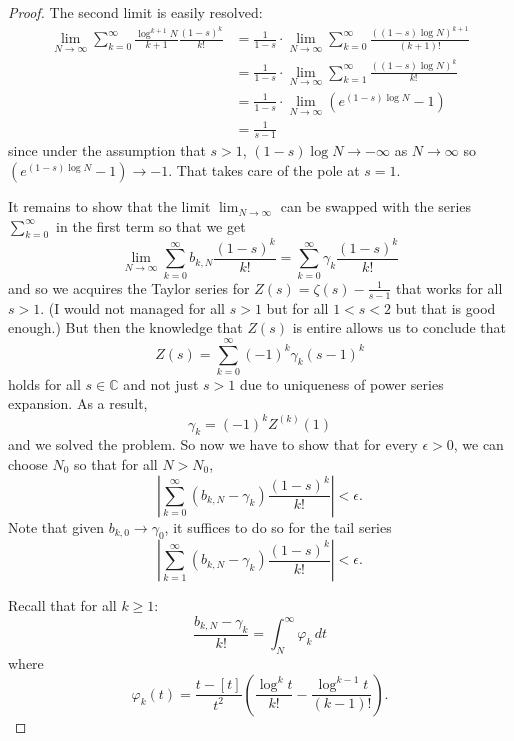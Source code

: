 \documentclass{article}
\newcommand{\C}{\mathbb{C}}
\newcommand{\Abs}[1]{\left| #1 \right|}
\begin{document}
\begin{proof}
The second limit is easily resolved:
\begin{align*}
\lim_{N \rightarrow \infty} \sum_{k = 0}^{\infty} \frac{\log^{k+1} N}{k+1} \frac{(1 - s)^k}{k!} &= \frac{1}{1 - s} \cdot \lim_{N \rightarrow \infty} \sum_{k = 0}^{\infty} \frac{((1 - s) \log N)^{k+1}}{(k+1)!}\\
&= \frac{1}{1 - s} \cdot \lim_{N \rightarrow \infty} \sum_{k = 1}^{\infty} \frac{((1 - s) \log N)^{k}}{k!}\\
&= \frac{1}{1 - s} \cdot \lim_{N \rightarrow \infty} (e^{(1 - s) \log N} - 1)\\
&= \frac{1}{s - 1}
\end{align*}
since under the assumption that $s > 1$, $(1 - s) \log N \rightarrow -\infty$ as $N \rightarrow \infty$ so $(e^{(1 - s) \log N} - 1) \rightarrow -1$. That takes care of the pole at $s = 1$.

It remains to show that the limit $\lim_{N \rightarrow \infty}$ can be swapped with the series $\sum_{k=0}^{\infty}$ in the first term so that we get
$$\lim_{N \rightarrow \infty} \sum_{k = 0}^{\infty} b_{k,N} \frac{(1 - s)^k}{k!} = \sum_{k = 0}^{\infty} \gamma_k \frac{(1 - s)^k}{k!}$$
and so we acquires the Taylor series for $Z(s) = \zeta(s) - \frac{1}{s-1}$ that works for all $s > 1$. (I would not managed for all $s > 1$ but for all $1 < s < 2$ but that is good enough.) But then the knowledge that $Z(s)$ is entire allows us to conclude that
$$Z(s) = \sum_{k = 0}^{\infty} (-1)^k \gamma_k (s - 1)^k$$
holds for all $s \in \C$ and not just $s > 1$ due to uniqueness of power series expansion. As a result,
$$\gamma_k = (-1)^k Z^{(k)}(1)$$
and we solved the problem. So now we have to show that for every $\epsilon > 0$, we can choose $N_0$ so that for all $N > N_0$,
$$\Abs{\sum_{k=0}^{\infty} \left( b_{k,N} - \gamma_k \right) \frac{(1 - s)^k}{k!} } < \epsilon.$$
Note that given  $b_{k,0} \rightarrow \gamma_0$, it suffices to do so for the tail series
$$\Abs{\sum_{k=1}^{\infty} \left( b_{k,N} - \gamma_k \right) \frac{(1 - s)^k}{k!} } < \epsilon.$$

Recall that for all $k \geq 1$:
$$\frac{b_{k,N} - \gamma_k}{k!} = \int_N^\infty \varphi_k \, dt$$
where
$$\varphi_k(t) = \frac{t - [t]}{t^2} \left( \frac{\log^k t}{k!} - \frac{\log^{k-1} t}{(k-1)!} \right).$$


\end{proof}
\end{document}
